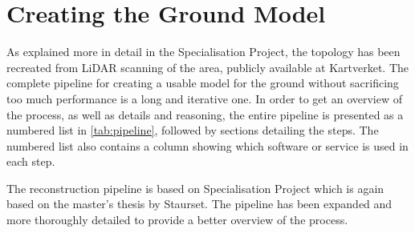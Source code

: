 \section{Creating the Ground Model}
    As explained more in detail in the Specialisation Project\cite{specialisation}, the topology has been recreated from LiDAR scanning of the area, publicly available at Kartverket\cite{hoydedata}. The complete pipeline for creating a usable model for the ground without sacrificing too much performance is a long and iterative one. In order to get an overview of the process, as well as details and reasoning, the entire pipeline is presented as a numbered list in \cref{tab:pipeline}, followed by sections detailing the steps. The numbered list also contains a column showing which software or service is used in each step.
    
   The reconstruction pipeline is based on Specialisation Project which is again based on the master's thesis by Staurset\cite{ski_jump}. The pipeline has been expanded and more thoroughly detailed to provide a better overview of the process.
    
    \setcounter{rownumbers}{0}
    
